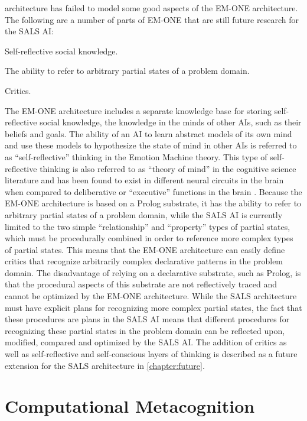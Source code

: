 architecture has failed to model some good aspects of the EM-ONE
architecture.  The following are a number of parts of EM-ONE that are
still future research for the SALS AI:
\begin{packed_enumerate}
\item{Self-reflective social knowledge.}
\item{The ability to refer to arbitrary partial states of a problem
  domain.}
\item{Critics.}
\end{packed_enumerate}
The EM-ONE architecture includes a separate knowledge base for storing
self-reflective social knowledge, the knowledge in the minds of other
AIs, such as their beliefs and goals.  The ability of an AI to learn
abstract models of its own mind and use these models to hypothesize
the state of mind in other AIs is referred to as ``self-reflective''
thinking in the Emotion Machine theory.  This type of self-reflective
thinking is also referred to as ``theory of mind'' in the cognitive
science literature and has been found to exist in different neural
circuits in the brain when compared to deliberative or ``executive''
functions in the brain \cite[]{saxe:2006}.  Because the EM-ONE
architecture is based on a Prolog substrate, it has the ability to
refer to arbitrary partial states of a problem domain, while the SALS
AI is currently limited to the two simple ``relationship'' and
``property'' types of partial states, which must be procedurally
combined in order to reference more complex types of partial states.
This means that the EM-ONE architecture can easily define critics that
recognize arbitrarily complex declarative patterns in the problem
domain.  The disadvantage of relying on a declarative substrate, such
as Prolog, is that the procedural aspects of this substrate are not
reflectively traced and cannot be optimized by the EM-ONE
architecture.  While the SALS architecture must have explicit plans
for recognizing more complex partial states, the fact that these
procedures are plans in the SALS AI means that different procedures
for recognizing these partial states in the problem domain can be
reflected upon, modified, compared and optimized by the SALS AI.  The
addition of critics as well as self-reflective and self-conscious
layers of thinking is described as a future extension for the SALS
architecture in {\mbox{\autoref{chapter:future}}}.

\section{Computational Metacognition}

